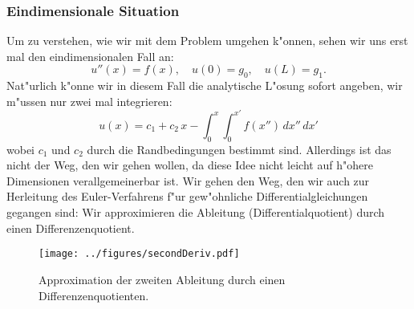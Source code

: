\subsubsection{Eindimensionale Situation}
Um zu verstehen, wie wir mit dem Problem umgehen k"onnen, 
sehen wir uns erst mal den eindimensionalen Fall an:
$$u''(x) = f(x),\quad u(0)=g_0,\quad u(L)=g_1.$$
Nat"urlich k"onne wir in diesem Fall die analytische L"osung 
sofort angeben, wir m"ussen nur zwei mal integrieren:
$$ 
u(x) = c_1+c_2\, x - \int_0^x\int_0^{x'} f(x'')\, dx''\, dx'$$
wobei $c_1$ und $c_2$ durch die Randbedingungen bestimmt sind. 
Allerdings ist das nicht der Weg, den wir gehen wollen, da diese
Idee nicht leicht auf h"ohere Dimensionen verallgemeinerbar ist. 
Wir gehen den Weg, den wir auch zur Herleitung des Euler-Verfahrens 
f"ur gew"ohnliche Differentialgleichungen gegangen sind: 
Wir approximieren die Ableitung (Differentialquotient) durch einen
Differenzenquotient. 


\begin{figure}[htbp]
 \centering
   \texttt{[image: ../figures/secondDeriv.pdf]}
   \caption{Approximation der zweiten Ableitung durch einen Differenzenquotienten.}
   \label{numPDEdiff}
\end{figure}


\bigskip

